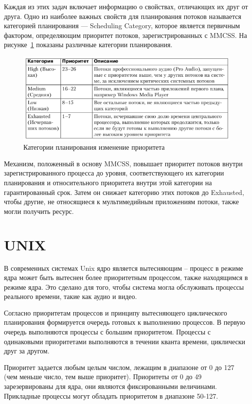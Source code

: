 \documentclass[a4paper, 12pt]{extreport}
\begin{document}
Каждая из этих задач включает информацию о свойствах, отличающих их друг от друга. Одно из наиболее важных свойств для 
планирования потоков называется категорией планирования — Scheduling Category, которое является первичным фактором, 
определяющим приоритет потоков, зарегистрированных с MMCSS. На рисунке~\ref{img:6} показаны различные категории 
планирования.

\begin{figure}[h]
	\centering
	\includegraphics[scale=1]{tools/6.png}
	\caption{Категории планирования изменение приоритета}
	\label{img:6}
\end{figure}

Механизм, положенный в основу MMCSS, повышает приоритет потоков внутри зарегистрированного процесса до уровня, 
соответствующего их категории планирования и относительного приоритета внутри этой категории на гарантированный срок. 
Затем он снижает категорию этих потоков до Exhausted, чтобы другие, не относящиеся к мультимедийным приложениям потоки, 
также могли получить ресурс.

\section{UNIX}

В современных системах Unix ядро является вытесняющим – процесс в режиме ядра может быть вытеснен более приоритетным 
процессом, также находящимся в режиме ядра. Это сделано для того, чтобы система могла обслуживать процессы реального 
времени, такие как  аудио и видео.

Согласно приоритетам процессов и принципу вытесняющего циклического планирования формируется очередь готовых к 
выполнению процессов. В первую очередь выполняются процессы с большим приоритетом. Процессы с одинаковыми 
приоритетами выполняются в течении кванта времени, циклически друг за другом.


Приоритет задается любым целым числом, лежащим в диапазоне от 0 до 127 (чем меньше число, тем выше приоритет). 
Приоритеты от 0 до 49 зарезервированы для ядра, они являются фиксированными величинами. Прикладные процессы могут 
обладать приоритетом в диапазоне 50-127.
\end{document}
